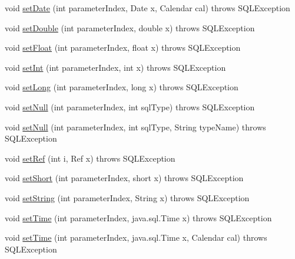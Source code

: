 \begin{DoxyCompactItemize}
void \mbox{\hyperlink{classcom_1_1mysql_1_1jdbc_1_1_server_prepared_statement_a00373006ec942cdbf2a59a4be5855067}{set\+Date}} (int parameter\+Index, Date x, Calendar cal)  throws S\+Q\+L\+Exception 
\item 
void \mbox{\hyperlink{classcom_1_1mysql_1_1jdbc_1_1_server_prepared_statement_a50bb9137b1cec3fbff1140ed19785841}{set\+Double}} (int parameter\+Index, double x)  throws S\+Q\+L\+Exception 
\item 
void \mbox{\hyperlink{classcom_1_1mysql_1_1jdbc_1_1_server_prepared_statement_ac1a444b7637bc226a3af13e86302dbe8}{set\+Float}} (int parameter\+Index, float x)  throws S\+Q\+L\+Exception 
\item 
void \mbox{\hyperlink{classcom_1_1mysql_1_1jdbc_1_1_server_prepared_statement_ae069199763eb91fc92b7db6c7ff583db}{set\+Int}} (int parameter\+Index, int x)  throws S\+Q\+L\+Exception 
\item 
void \mbox{\hyperlink{classcom_1_1mysql_1_1jdbc_1_1_server_prepared_statement_a5bedcb6eb68aadc6691bba3b63b5904a}{set\+Long}} (int parameter\+Index, long x)  throws S\+Q\+L\+Exception 
\item 
void \mbox{\hyperlink{classcom_1_1mysql_1_1jdbc_1_1_server_prepared_statement_ad4e2103ca03ca7d468bcfb5bd4adc48e}{set\+Null}} (int parameter\+Index, int sql\+Type)  throws S\+Q\+L\+Exception 
\item 
void \mbox{\hyperlink{classcom_1_1mysql_1_1jdbc_1_1_server_prepared_statement_a1b4bbc47755290d3b7ff6598aa127389}{set\+Null}} (int parameter\+Index, int sql\+Type, String type\+Name)  throws S\+Q\+L\+Exception 
\item 
void \mbox{\hyperlink{classcom_1_1mysql_1_1jdbc_1_1_server_prepared_statement_a5f91135ca91172666ffc7998eb6ee95c}{set\+Ref}} (int i, Ref x)  throws S\+Q\+L\+Exception 
\item 
void \mbox{\hyperlink{classcom_1_1mysql_1_1jdbc_1_1_server_prepared_statement_ae6a2fa994a7c41fb1b5afa5826e1e447}{set\+Short}} (int parameter\+Index, short x)  throws S\+Q\+L\+Exception 
\item 
void \mbox{\hyperlink{classcom_1_1mysql_1_1jdbc_1_1_server_prepared_statement_ab4b57b9dce4d775c23a01c462bc86b18}{set\+String}} (int parameter\+Index, String x)  throws S\+Q\+L\+Exception 
\item 
void \mbox{\hyperlink{classcom_1_1mysql_1_1jdbc_1_1_server_prepared_statement_ad97cc0f62d7be5fcb82e97a00a216b24}{set\+Time}} (int parameter\+Index, java.\+sql.\+Time x)  throws S\+Q\+L\+Exception 
\item 
void \mbox{\hyperlink{classcom_1_1mysql_1_1jdbc_1_1_server_prepared_statement_a453ae0ad1d29d62a83de753e35dd0baf}{set\+Time}} (int parameter\+Index, java.\+sql.\+Time x, Calendar cal)  throws S\+Q\+L\+Exception 

\end{DoxyCompactItemize}
